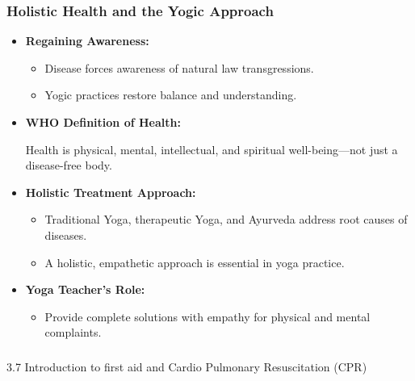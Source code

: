 \begin{frame}[fragile]\frametitle{Holistic Health and the Yogic Approach}

      \begin{itemize}
        \item \textbf{Regaining Awareness:}
        \begin{itemize}
            \item Disease forces awareness of natural law transgressions.
            \item Yogic practices restore balance and understanding.
        \end{itemize}
        \item \textbf{WHO Definition of Health:}
        
        Health is physical, mental, intellectual, and spiritual well-being—not just a disease-free body.
        
        \item \textbf{Holistic Treatment Approach:}
        \begin{itemize}
            \item Traditional Yoga, therapeutic Yoga, and Ayurveda address root causes of diseases.
            \item A holistic, empathetic approach is essential in yoga practice.
        \end{itemize}
        \item \textbf{Yoga Teacher's Role:}
        \begin{itemize}
            \item Provide complete solutions with empathy for physical and mental complaints.
        \end{itemize}
      \end{itemize}

\end{frame}

\begin{frame}[fragile]\frametitle{}
\begin{center}
{\Large 3.7 Introduction to ﬁrst aid and Cardio Pulmonary Resuscitation (CPR)}
\end{center}
\end{frame}

